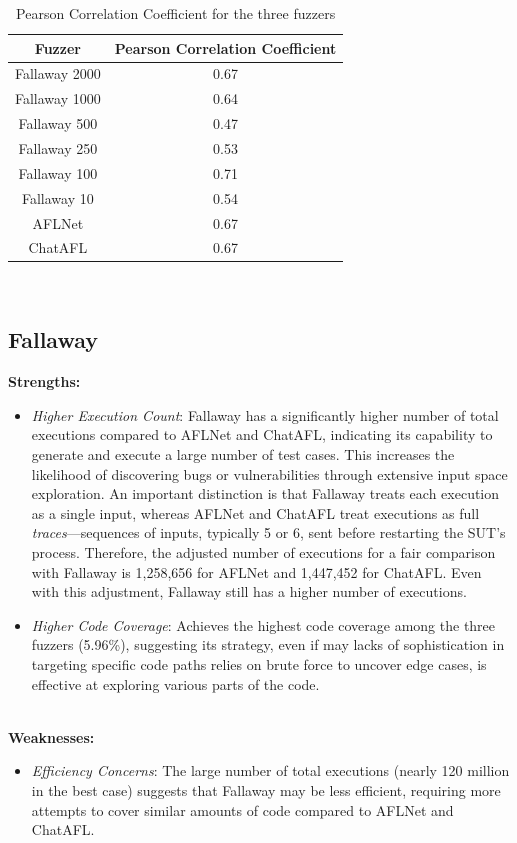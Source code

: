 \begin{table}[H]
    \centering
    \begin{tabular}{|c|c|}
    \hline
    \textbf{Fuzzer} & \textbf{Pearson Correlation Coefficient} \\
    \hline
    Fallaway 2000 & 0.67 \\
    \hline
    Fallaway 1000 & 0.64 \\
    \hline
    Fallaway 500 & 0.47 \\
    \hline
    Fallaway 250 & 0.53 \\
    \hline
    Fallaway 100 & 0.71 \\
    \hline
    Fallaway 10 & 0.54 \\
    \hline
    AFLNet & 0.67 \\
    \hline
    ChatAFL & 0.67 \\
    \hline
    \end{tabular}
    \caption{Pearson Correlation Coefficient for the three fuzzers}
    \label{tab:pearson_correlation}
\end{table}

\phantom{}\\

\subsection{Fallaway}
\label{sec:fallaway_analysis}

\textbf{Strengths:}
\begin{itemize}
    \item \textit{Higher Execution Count}: Fallaway has a significantly higher number of total executions compared to AFLNet and ChatAFL, indicating its capability to generate and execute a large number of test cases. This increases the likelihood of discovering bugs or vulnerabilities through extensive input space exploration. An important distinction is that Fallaway treats each execution as a single input, whereas AFLNet and ChatAFL treat executions as full \textit{traces}—sequences of inputs, typically 5 or 6, sent before restarting the SUT's process. Therefore, the adjusted number of executions for a fair comparison with Fallaway is 1,258,656 for AFLNet and 1,447,452 for ChatAFL. Even with this adjustment, Fallaway still has a higher number of executions.
    \item \textit{Higher Code Coverage}: Achieves the highest code coverage among the three fuzzers (5.96\%), suggesting its strategy, even if may lacks of  sophistication in targeting specific code paths relies on brute force to uncover edge cases, is effective at exploring various parts of the code.
\end{itemize}
\phantom{}\\
\textbf{Weaknesses:}
\begin{itemize}
    \item \textit{Efficiency Concerns}: The large number of total executions (nearly 120 million in the best case) suggests that Fallaway may be less efficient, requiring more attempts to cover similar amounts of code compared to AFLNet and ChatAFL.
\end{itemize}


